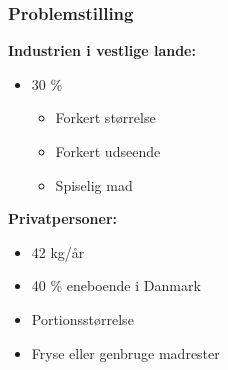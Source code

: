 \begin{frame}
\frametitle{Problemstilling}

	
	\textbf{Industrien i vestlige lande:}
	\begin{itemize}		
		\item 30 \% 
		\begin{itemize}
			\item Forkert størrelse
			\item Forkert udseende
			\item Spiselig mad
		\end{itemize}
	\end{itemize}	
	\textbf{Privatpersoner:}	
	\begin{itemize}
		\item 42 kg/år
		\item 40 \% eneboende i Danmark
		\item Portionsstørrelse
		\item Fryse eller genbruge madrester
	\end{itemize}
	

\end{frame}